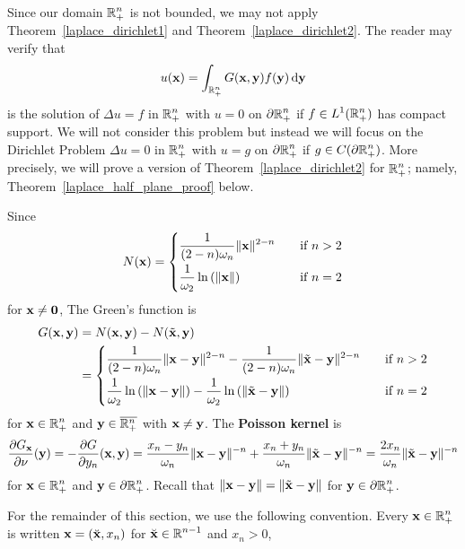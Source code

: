 Since our domain $\displaystyle \mathbb{R}^n_+$ is not bounded, we may not apply
Theorem~\ref{laplace_dirichlet1} and
Theorem~\ref{laplace_dirichlet2}.  The reader may verify that
\[
u(\mathbf{x}) = \int_{\mathbb{R}^n_+} G(\mathbf{x},\mathbf{y})f(\mathbf{y}) \,\mathrm{d}{\mathbf{y}}
\]
is the solution of $\Delta u = f$ in $\displaystyle \mathbb{R}^n_+$ with $u = 0$ on
$\displaystyle \partial \mathbb{R}^n_+$ if
$\displaystyle f \in L^1(\mathbb{R}^n_+)$ has compact support.  We
will not consider this problem but instead we will focus on the
Dirichlet Problem $\Delta u = 0$ in $\displaystyle \mathbb{R}^n_+$ with $u=g$ on
$\displaystyle \partial \mathbb{R}^n_+$ if
$\displaystyle g \in C(\partial \mathbb{R}^n_+)$.  More precisely, we
will prove a version of Theorem~\ref{laplace_dirichlet2} for
$\displaystyle \mathbb{R}^n_+$; namely,
Theorem~\ref{laplace_half_plane_proof} below.

Since
\[
N(\mathbf{x}) =
\begin{cases}
\displaystyle \frac{1}{(2-n)\omega_n} \|\mathbf{x}\|^{2-n} & \quad 
\text{if} \ n>2 \\[0.8em]
\displaystyle \frac{1}{\omega_2} \ln\left(\|\mathbf{x}\|\right) & \quad 
\text{if} \ n=2
\end{cases}
\]
for $\mathbf{x} \neq \mathbf{0}$, The Green's function is
\begin{align*}
G(\mathbf{x},\mathbf{y}) &= N(\mathbf{x},\mathbf{y}) - N(\tilde{\mathbf{x}},\mathbf{y}) \\
&=
\begin{cases}
\displaystyle \frac{1}{(2-n)\omega_n} \|\mathbf{x}-\mathbf{y}\|^{2-n} -
\frac{1}{(2-n)\omega_n} \|\tilde{\mathbf{x}}-\mathbf{y}\|^{2-n} & \quad 
\text{if} \ n>2 \\[0.8em]
\displaystyle \frac{1}{\omega_2} \ln\left(\|\mathbf{x}-\mathbf{y}\|\right) -
\frac{1}{\omega_2} \ln\left(\|\tilde{\mathbf{x}}-\mathbf{y}\|\right) & \quad 
\text{if} \ n=2
\end{cases}
\end{align*}
for $\displaystyle \mathbf{x} \in \mathbb{R}^n_+$ and
$\displaystyle \mathbf{y}\in \overline{\mathbb{R}^n_+}$ with
$\mathbf{x} \neq \mathbf{y}$.  The
{\bfseries Poisson kernel} is
\[
\frac{\partial{G_{\mathbf{x}}}}{\partial \mathbf{\nu}}(\mathbf{y}) = -\frac{\partial{G}}{\partial y_n}(\mathbf{x},\mathbf{y}) =
\frac{x_n-y_n}{\omega_n} \|\mathbf{x}-\mathbf{y}\|^{-n}
+\frac{x_n+y_n}{\omega_n} \|\tilde{\mathbf{x}}-\mathbf{y}\|^{-n}
= \frac{2x_n}{\omega_n} \|\tilde{\mathbf{x}}-\mathbf{y}\|^{-n}
\]
for $\displaystyle \mathbf{x} \in \mathbb{R}^n_+$ and
$\displaystyle \mathbf{y} \in \partial \mathbb{R}^n_+$.  Recall
that $\|\mathbf{x}-\mathbf{y}\| = \|\tilde{\mathbf{x}}-\mathbf{y}\|$ for
$\displaystyle \mathbf{y} \in \partial \mathbb{R}^n_+$.

For the remainder of this section, we use the following convention.
Every $\displaystyle \mathbf{x}\in \mathbb{R}^n_+$ is written 
$\mathbf{x} = (\breve{\mathbf{x}}, x_n)$ for
$\displaystyle \breve{\mathbf{x}} \in \mathbb{R}^{n-1}$ and $x_n>0$,

